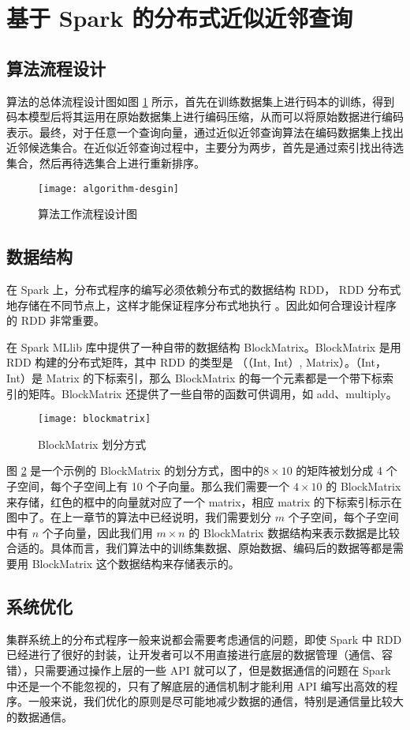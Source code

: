 \section{基于 Spark 的分布式近似近邻查询}
\subsection{算法流程设计}
算法的总体流程设计图如图 \ref{fig:algorithm-desgin} 所示，首先在训练数据集上进行码本的训练，得到码本模型后将其运用在原始数据集上进行编码压缩，从而可以将原始数据进行编码表示。最终，对于任意一个查询向量，通过近似近邻查询算法在编码数据集上找出近邻候选集合。在近似近邻查询过程中，主要分为两步，首先是通过索引找出待选集合，然后再待选集合上进行重新排序。
\begin{figure}[H]
  \centering
  \texttt{[image: algorithm-desgin]}
  \caption{算法工作流程设计图}
  \label{fig:algorithm-desgin}
\end{figure}
\subsection{数据结构}
在 Spark 上，分布式程序的编写必须依赖分布式的数据结构 RDD， RDD 分布式地存储在不同节点上，这样才能保证程序分布式地执行 。因此如何合理设计程序的 RDD 非常重要。

在 Spark MLlib 库中提供了一种自带的数据结构 BlockMatrix。BlockMatrix 是用 RDD 构建的分布式矩阵，其中 RDD 的类型是 （（Int, Int）, Matrix）。（Int，Int）是 Matrix 的下标索引，那么 BlockMatrix 的每一个元素都是一个带下标索引的矩阵。BlockMatrix 还提供了一些自带的函数可供调用，如 add、multiply。

\begin{figure}[H]
  \centering
  \texttt{[image: blockmatrix]}
  \caption{BlockMatrix 划分方式}
  \label{fig:blockmatrix}
\end{figure}

图 \ref{fig:blockmatrix} 是一个示例的 BlockMatrix 的划分方式，图中的$ 8\times 10$ 的矩阵被划分成 4 个子空间，每个子空间上有 10 个子向量。那么我们需要一个 $4\times 10$ 的 BlockMatrix 来存储，红色的框中的向量就对应了一个 matrix，相应 matrix 的下标索引标示在图中了。在上一章节的算法中已经说明，我们需要划分 $m$ 个子空间，每个子空间中有 $n$ 个子向量，因此我们用 $m\times n$ 的 BlockMatrix 数据结构来表示数据是比较合适的。具体而言，我们算法中的训练集数据、原始数据、编码后的数据等都是需要用 BlockMatrix 这个数据结构来存储表示的。
\subsection{系统优化}
集群系统上的分布式程序一般来说都会需要考虑通信的问题，即使 Spark 中 RDD 已经进行了很好的封装，让开发者可以不用直接进行底层的数据管理（通信、容错），只需要通过操作上层的一些 API 就可以了，但是数据通信的问题在 Spark 中还是一个不能忽视的，只有了解底层的通信机制才能利用 API 编写出高效的程序。一般来说，我们优化的原则是尽可能地减少数据的通信，特别是通信量比较大的数据通信。

